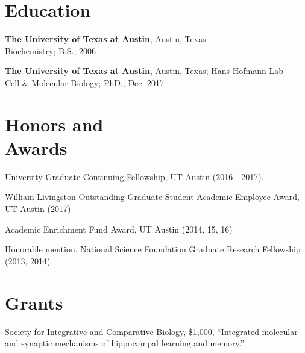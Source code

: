 \documentclass[margin,line]{resume}
\begin{document}
\pagestyle{plain}

\begin{resume}

    \section{\mysidestyle Education}

    {\bf The University of Texas at Austin}, Austin, Texas \\Biochemistry; B.S., 2006


    {\bf The University of Texas at Austin}, Austin, Texas; Hans Hofmann Lab
\\Cell \& Molecular Biology; PhD., Dec. 2017

    \section{\mysidestyle Honors and\\Awards} 

\begin{description}[leftmargin=0pt]  
\setlength{\itemsep}{4pt} 
\item[] University Graduate Continuing Fellowship, UT Austin (2016 - 2017).
\item[] William Livingston Outstanding Graduate Student Academic Employee Award, UT Austin (2017)
\item[] Academic Enrichment Fund Award, UT Austin (2014, 15, 16)
\item[] Honorable mention, National Science Foundation Graduate Research Fellowship (2013, 2014)
\end{description}

\section{\mysidestyle Grants}
\raggedright
Society for Integrative and Comparative Biology, \$1,000, 
``Integrated molecular and synaptic mechanisms of hippocampal learning and memory.''


\end{resume}
\end{document}
